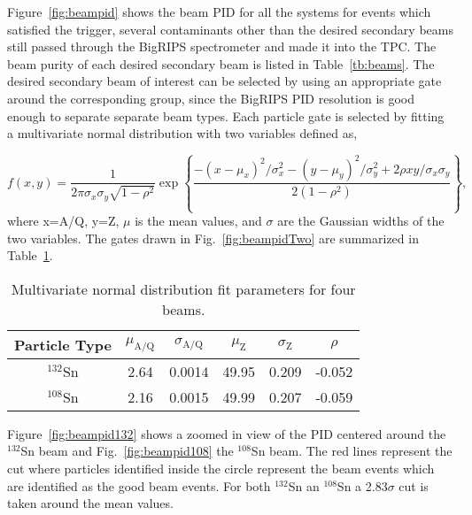 Figure~\ref{fig:beampid} shows the beam PID for all the systems for events which satisfied the trigger, several contaminants other than the desired secondary beams still passed through the BigRIPS spectrometer and made it into the TPC. The beam purity of each desired secondary beam is listed in Table~\ref{tb:beams}. The desired secondary beam of interest can be selected by using an appropriate gate around the corresponding group, since the BigRIPS PID resolution is good enough to separate separate beam types. Each particle gate is selected by fitting a multivariate normal distribution with two variables defined as,

\begin{equation}
  f(x,y)=\frac1{2\pi\sigma_x\sigma_y\sqrt{1-\rho^2}}\exp\left\{
  \frac{-(x - \mu_{x})^2/\sigma_x^2-(y-\mu_{y})^2/\sigma_y^2+2\rho
  xy/\sigma_x\sigma_y}{2(1-\rho^2)}\right\},
   \label{multiGauss}
\end{equation}
where x=A/Q, y=Z, $\mu$ is the mean values, and $\sigma$ are the Gaussian widths of the two variables. The gates drawn in Fig.~\ref{fig:beampidTwo} are summarized in Table~\ref{beamParameters}. 

\begin{table}[!htb]
  \begin{center}
    \begin{tabular}{cccccc}
      \hline 
      Particle Type & $\mu_\mathrm{A/Q}$ & $\sigma_\mathrm{A/Q}$ & $\mu_\mathrm{Z}$ &
      $\sigma_\mathrm{Z}$ & $\rho$\\
      \hline\hline 
      ${}^{132}$Sn & 2.64 & 0.0014 & 49.95 & 0.209 & -0.052 \\
      ${}^{108}$Sn & 2.16 & 0.0015 & 49.99 & 0.207 & -0.059 \\
      \hline
    \end{tabular}
    \caption{Multivariate normal distribution fit parameters for four beams.
    \label{beamParameters}}
  \end{center}
\end{table}
Figure~\ref{fig:beampid132} shows a zoomed in view of the PID centered around the ${}^{132}$Sn beam and Fig.~\ref{fig:beampid108} the ${}^{108}$Sn beam. The red lines represent the cut where particles identified inside the circle represent the beam events which are identified as the good beam events. For both ${}^{132}$Sn an ${}^{108}$Sn a 2.83$\sigma$ cut is taken around the mean values.  


